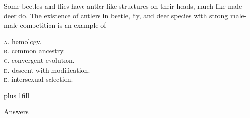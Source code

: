 \documentclass[letterpaper]{tufte-handout}
\begin{document}
\bigskip

\noindent Some beetles and flies have antler-like structures on their heads, much like male deer do. The existence of antlers in beetle, fly, and deer species with strong male-male competition is an example of 


\smallskip

\textsc{a}. homology.\\
\textsc{b}. common ancestry. \\
\textsc{c}. convergent evolution. \\
\textsc{d}. descent with modification. \\
\textsc{e}. intersexual selection.




\vskip0pt plus 1fill

\hfill Answers 
\end{document}
